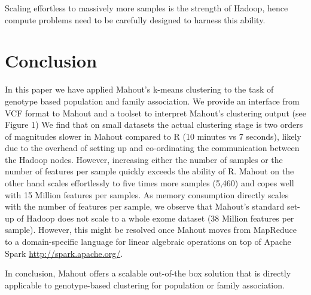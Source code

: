\documentclass{bioinfo}
\begin{document}
Scaling effortless to massively more samples is the strength of Hadoop, hence compute problems need to be carefully designed to harness this ability.  



\section*{Conclusion}
In this paper we have applied Mahout's k-means clustering to the task of genotype based population and family association. 
We provide an interface from VCF format to Mahout and a toolset to interpret Mahout's clustering output (see Figure 1)
We find that on small datasets the actual clustering stage is two orders of magnitudes slower in Mahout compared to R (10 minutes vs 7 seconds), likely due to the overhead of setting up and co-ordinating the communication between the Hadoop nodes. 
However, increasing either the number of samples or the number of features per sample quickly exceeds the ability of R.
Mahout on the other hand scales effortlessly to five times more samples (5,460) and copes well with 15 Million features per samples.
As memory consumption directly scales with the number of features per sample, we observe that Mahout's standard set-up of Hadoop does not scale to a whole exome dataset (38 Million features per sample).
However, this might be resolved once Mahout moves from MapReduce to a domain-specific language for linear algebraic operations on top of Apache Spark \url{http://spark.apache.org/}.

In conclusion, Mahout offers a scalable out-of-the box solution that is directly applicable to genotype-based clustering for population or family association. 

\end{document}
